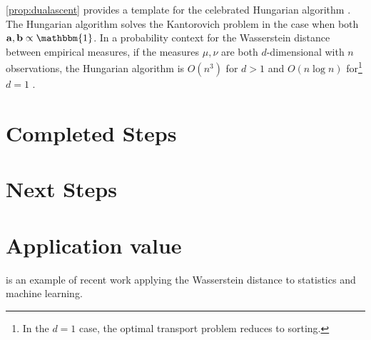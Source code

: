 \documentclass[11pt,reqno]{amsart}
\newcommand{\one}{\mathbbm{1}}
\renewcommand{\b}{\mathbf}
\theoremstyle{definition}
\theoremstyle{remark}
\begin{document}
\cref{prop:dualascent} provides a template for the celebrated Hungarian
algorithm \cite{kuhn2010hungarian}. The Hungarian algorithm solves the
Kantorovich problem in the case when both $\b a, \b b \propto \one$. In a
probability context for the Wasserstein distance between empirical measures,
if the measures $\mu, \nu$ are both $d$-dimensional with $n$ observations,
the Hungarian algorithm is $O(n^3)$ for $d>1$ and $O(n\log n)$
for\footnote{In the $d=1$ case, the optimal transport problem reduces to
sorting.} $d = 1$ \cite{bernton2017inference}.

\section{Completed Steps}


\section{Next Steps}


\section{Application value}
 
\cite{bernton2017inference} is an example of recent work applying the
Wasserstein distance to statistics and machine learning. 



\end{document}
